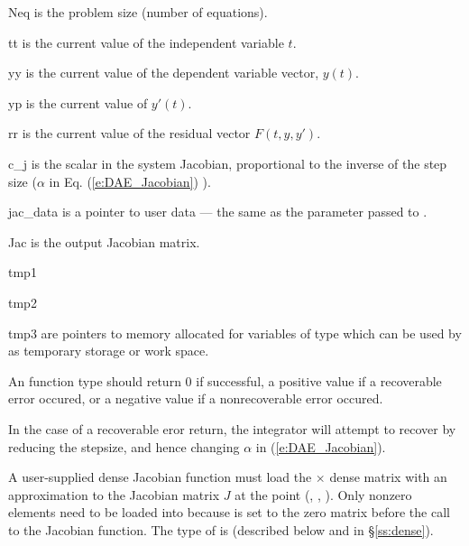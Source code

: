 {{}
{
  \begin{args}
  \item[Neq]
    is the problem size (number of equations).
  \item[tt]
    is the current value of the independent variable $t$.
  \item[yy]
    is the current value of the dependent variable vector, $y(t)$.
  \item[yp]
    is the current value of $y'(t)$.
  \item[rr]
    is the current value of the residual vector $F(t,y,y')$.
  \item[c\_j]
    is the scalar in the system Jacobian, proportional to the inverse of the
    step size ($\alpha$ in Eq. (\ref{e:DAE_Jacobian}) ).
  \item[jac\_data]
    is a pointer to user data --- the same as the       
    parameter passed to .   
  \item[Jac]
    is the output Jacobian matrix.  
  \item[tmp1]
  \item[tmp2]
  \item[tmp3]
    are pointers to memory allocated for variables of type  
    which can be used by  as temporary storage or work space.
  \end{args}
}
{
  An  function type should return $0$ if successful,
  a positive value if a recoverable error occured, or a negative value
  if a nonrecoverable error occured. 

  In the case of a recoverable eror return, 
  the integrator will attempt to recover by reducing the stepsize,
  and hence changing $\alpha$ in (\ref{e:DAE_Jacobian}).
}
{
  A user-supplied dense Jacobian function must load the  $\times$ 
  dense matrix  with an approximation to the Jacobian matrix $J$
  at the point (, , ).  Only nonzero elements need to be loaded
  into  because  is set to the zero matrix before the call
  to the Jacobian function. The type of  is  
  (described below and in \S\ref{ss:dense}). 
  
}}
